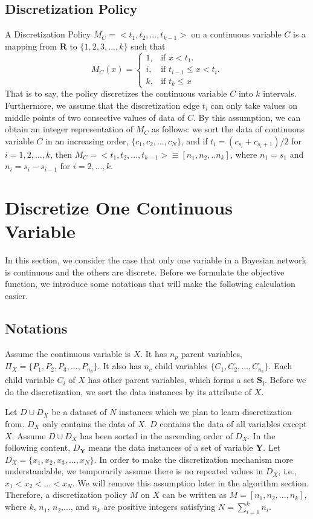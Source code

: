 \subsection{Discretization Policy}
\label{Disc_p}
A Discretization Policy $M_C = < t_1,t_2, ..., t_{k-1} >$ on a continuous variable $C$ is a mapping from $\boldsymbol{R}$ to $\{1,2,3,...,k \}$ such that
\begin{equation}
  M_C (x)=\begin{cases}
    1, & \text{if $x<t_1$}.\\
    i, & \text{if $t_{i-1} \leq x < t_i$}.\\
    k, & \text{if $t_k \leq x$}
  \end{cases}
\end{equation}
That is to say, the policy discretizes the continuous variable $C$ into $k$ intervals. Furthermore, we assume that the discretization edge $t_i$ can only take values on middle points of two consective values of data of $C$. By this assumption, we can obtain an integer representation of $M_C$ as follows: 
we sort the data of continuous variable $C$ in an increasing order, $\{ c_1,c_2,...,c_N \}$, and if $t_i = (c_{s_{i}} + c_{s_{i}+1})/2$ for $i=1,2,...,k$, then $M_C = < t_1,t_2, ..., t_{k-1} > \equiv [n_1,n_2,..n_k]$, where $n_1 = s_1$ and $n_i = s_{i} - s_{i-1}$ for $i = 2,...,k$.\\

\section{Discretize One Continuous Variable}
\label{one-conti}
In this section, we consider the case that only one variable in a Bayesian network is continuous and the others are discrete. Before we formulate the objective function, we introduce some notations that will make the following calculation easier.
\subsection{Notations}
\label{Notation}
Assume the continuous variable is $X$. It has $n_p$ parent variables, $\Pi_X = \{ P_1, P_2, P_3,...,P_{n_p}\}$. It also has $n_c$ child variables $\{ C_1, C_2,...,C_{n_c}\}$. Each child variable $C_i$ of $X$ has other parent variables, which forms a set $\boldsymbol{S_i}$. Before we do the discretization, we sort the data instances by its attribute of $X$.

Let $D \cup D_X$ be a dataset of $N$ instances which we plan to learn discretization from. $D_X$ only contains the data of $X$. $D$ contains the data of all variables except $X$.  Assume $D \cup D_X$ has been sorted in the ascending order of $D_X$. In the following content, $D_{\boldsymbol{Y}}$ means the data instances of a set of variable $\boldsymbol{Y}$. Let $D_X = \{ x_1,x_2,x_3,...,x_N \}$. In order to make the discretization mechanism more understandable, we temporarily assume there is no repeated values in $D_X$, i.e., $x_1 < x_2 < ... < x_N$. We will remove this assumption later in the algorithm section. Therefore, a discretization policy $M$ on $X$ can be written as $M = [n_1,n_2,...,n_k]$, where $k$, $n_1$, $n_2$,..., and $n_k$ are positive integers satisfying $N = \sum_{i=1}^k n_i$.

